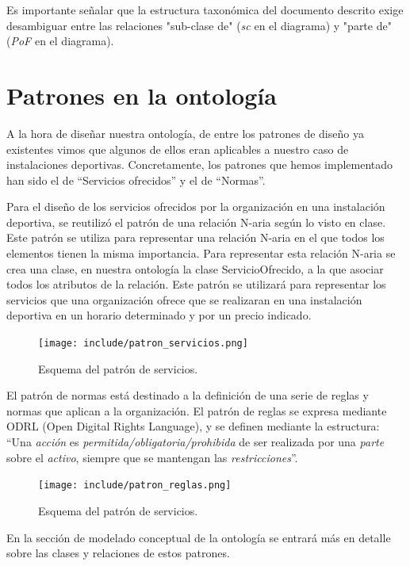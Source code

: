 \documentclass[a4paper,12pt]{article}
\begin{document}
	Es importante señalar que la estructura taxonómica del documento descrito exige desambiguar entre las relaciones "sub-clase de" (\textit{sc} en el diagrama) y "parte de" (\textit{PoF} en el diagrama).
	
	\section{Patrones en la ontología}
	
	A la hora de diseñar nuestra ontología, de entre los patrones de diseño ya existentes vimos que
algunos de ellos eran aplicables a nuestro caso de instalaciones deportivas. Concretamente, los
patrones que hemos implementado han sido el de “Servicios ofrecidos” y el de “Normas”.
	
	Para el diseño de los servicios ofrecidos por la organización en una instalación deportiva, se
reutilizó el patrón de una relación N-aria según lo visto en clase. Este patrón se utiliza para
representar una relación N-aria en el que todos los elementos tienen la misma importancia. Para
representar esta relación N-aria se crea una clase, en nuestra ontología la clase ServicioOfrecido,
a la que asociar todos los atributos de la relación. Este patrón se utilizará para representar los
servicios que una organización ofrece que se realizaran en una instalación deportiva en un horario
determinado y por un precio indicado.
	
	\begin{figure}[H]
		\centering
		\texttt{[image: include/patron\_servicios.png]}
		\caption{Esquema del patrón de servicios.}
	\end{figure}

	El patrón de normas está destinado a la definición de una serie de reglas y normas que aplican a
la organización. El patrón de reglas se expresa mediante ODRL (Open Digital Rights Language),
y se definen mediante la estructura:	“Una \textit{acción} es \textit{permitida/obligatoria/prohibida} de ser realizada por una \textit{parte} sobre el \textit{activo},
siempre que se mantengan las \textit{restricciones}”.
	
	\begin{figure}[H]
		\centering
		\texttt{[image: include/patron\_reglas.png]}
		\caption{Esquema del patrón de servicios.}
	\end{figure}
	
	En la sección de modelado conceptual de la ontología se entrará más en detalle sobre las clases y
relaciones de estos patrones.
	
\end{document}
